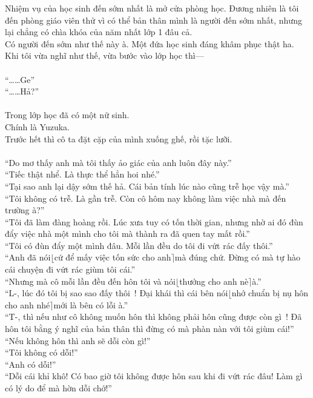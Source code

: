 \documentclass[12pt,a4paper, twosides]{book}
\begin{document}
Nhiệm vụ của học sinh đến sớm nhất là mở cửa phòng học. Đương nhiên là tôi đến phòng giáo viên thử vì có thể bản thân mình là người đến sớm nhất, nhưng lại chẳng có chìa khóa của năm nhất lớp 1 đâu cả.\\
Có người đến sớm như thế này à. Một đứa học sinh đáng khâm phục thật ha.\\
Khi tôi vừa nghĩ như thế, vừa bước vào lớp học thì—\\
\\
“……Ge”\\
“……Hả?”\\
\\
Trong lớp học đã có một nữ sinh.\\
Chính là Yuzuka.\\
Trước hết thì cô ta đặt cặp của mình xuống ghế, rồi tặc lưỡi.\\
\\
“Do mơ thấy anh mà tôi thấy ảo giác của anh luôn đây này.”\\
“Tiếc thật nhể. Là thực thể hẳn hoi nhé.”\\
“Tại sao anh lại dậy sớm thế hả. Cái bản tính lúc nào cũng trễ học vậy mà.”\\
“Tôi không có trễ. Là gần trễ. Còn cô hôm nay không làm việc nhà mà đến trường à?”\\
“Tôi đã làm đàng hoàng rồi. Lúc xưa tuy có tốn thời gian, nhưng nhờ ai đó đùn đẩy việc nhà một mình cho tôi mà thành ra đã quen tay mất rồi.”\\
“Tôi có đùn đẩy một mình đâu. Mỗi lần đều do tôi đi vứt rác đấy thôi.”\\
“Anh đã nói$\lfloor$cứ để mấy việc tốn sức cho anh$\rceil$mà đúng chứ. Đừng có mà tự hào cái chuyện đi vứt rác giùm tôi cái.”\\
“Nhưng mà cô mỗi lần đều đến hôn tôi và nói$\lfloor$thưởng cho anh nè$\rceil$à.”\\
“L-, lúc đó tôi bị sao sao đấy thôi~! Đại khái thì cái bên nói$\lfloor$nhớ chuẩn bị nụ hôn cho anh nhé$\rceil$mới là bên có lỗi à.”\\
“T-, thì nếu như cô không muốn hôn thì không phải hôn cũng được còn gì~! Đã hôn tôi bằng ý nghĩ của bản thân thì đừng có mà phàn nàn với tôi giùm cái!”\\
“Nếu không hôn thì anh sẽ dỗi còn gì!”\\
“Tôi không có dỗi!”\\
“Anh có dỗi!”\\
“Dỗi cái khỉ khô! Có bao giờ tôi không được hôn sau khi đi vứt rác đâu! Làm gì có lý do để mà hờn dỗi chớ!”\\
\end{document}
